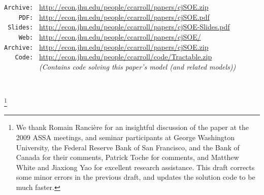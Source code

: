 \documentclass[titlepage]{\econtex}\newcommand{\texname}{cjSOE}
\begin{document}
\begin{small}
\parbox{\textwidth}{
\begin{center}
\begin{tabbing}
\texttt{Archive:~} \= \= \url{http://econ.jhu.edu/people/ccarroll/papers/cjSOE.zip} \kill \\  %
\texttt{~~~~PDF:~}\> \> \url{http://econ.jhu.edu/people/ccarroll/papers/cjSOE.pdf} \\
\texttt{~Slides:~}\> \> \url{http://econ.jhu.edu/people/ccarroll/papers/cjSOE-Slides.pdf} \\
\texttt{~~~~Web:~} \> \> \url{http://econ.jhu.edu/people/ccarroll/papers/cjSOE/}    \\
\texttt{Archive:~} \> \> \url{http://econ.jhu.edu/people/ccarroll/papers/cjSOE.zip} \\
\texttt{~~~Code:~} \> \> \url{http://econ.jhu.edu/people/ccarroll/code/Tractable.zip} \\
\texttt{~~~~~~~~~} \> \> {\it (Contains code solving this paper's model (and related models))}
\end{tabbing}
\end{center}
}
\end{small}

\begin{authorsinfo}
\\
\end{authorsinfo}

\thanks{We thank Romain Ranci\`ere for an insightful discussion of the
  paper at the 2009 ASSA meetings, and seminar participants at George
  Washington University, the Federal Reserve Bank of San Francisco,
  and the Bank of Canada for their comments, Patrick Toche for
  comments, and Matthew White and Jiaxiong Yao for excellent research assistance.  This draft corrects some minor errors in the previous draft, and updates the solution code to be much faster.}

\titlepagefinish
\setcounter{page}{1}
\end{document}
